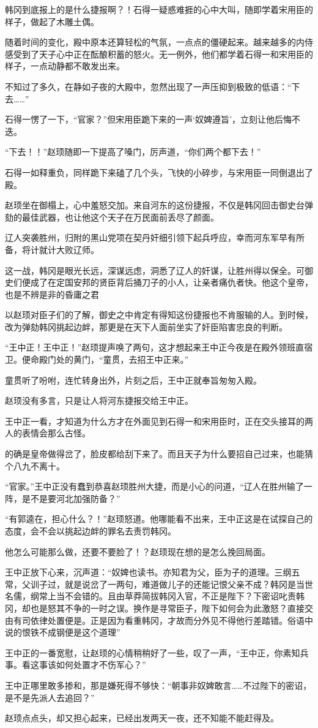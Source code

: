 韩冈到底报上的是什么捷报啊？！石得一疑惑难捱的心中大叫，随即学着宋用臣的样子，做起了木雕土偶。

随着时间的变化，殿中原本还算轻松的气氛，一点点的僵硬起来。越来越多的内侍感受到了天子心中正在酝酿积蓄的怒火。无一例外，他们都学着石得一和宋用臣的样子，一点动静都不敢发出来。

不知过了多久，在静如子夜的大殿中，忽然出现了一声压抑到极致的低语：“下去……”

石得一愣了一下，“官家？”但宋用臣跪下来的一声‘奴婢遵旨’，立刻让他后悔不迭。

“下去！！”赵顼随即一下提高了嗓门，厉声道，“你们两个都下去！”

石得一如释重负，同样跪下来磕了几个头，飞快的小碎步，与宋用臣一同倒退出了殿。

赵顼坐在御榻上，心中羞怒交加。来自河东的这份捷报，不仅是韩冈回击御史台弹劾的最佳武器，也让他这个天子在万民面前丢尽了颜面。

辽人突袭胜州，归附的黑山党项在契丹奸细引领下起兵呼应，幸而河东军早有所备，将计就计大败辽师。

这一战，韩冈是眼光长远，深谋远虑，洞悉了辽人的奸谋，让胜州得以保全。可御史们便成了在定国安邦的贤臣背后捅刀子的小人，让亲者痛仇者快。他这个皇帝，也是不辨是非的昏庸之君

以赵顼对臣子们的了解，御史之中肯定有得知这份捷报也不肯服输的人。到时候，改为弹劾韩冈挑起边衅，那更是在天下人面前坐实了奸臣陷害忠良的判断。

“王中正！王中正！”赵顼提声唤了两句，这才想起来王中正今夜是在殿外领班直宿卫。便命殿门处的黄门，“童贯，去招王中正来。”

童贯听了吩咐，连忙转身出外，片刻之后，王中正就奉旨匆匆入殿。

赵顼没有多言，只是让人将河东捷报交给王中正。

王中正一看，才知道为什么方才在外面见到石得一和宋用臣时，正在交头接耳的两人的表情会那么古怪。

的确是皇帝做得岔了，脸皮都给刮下来了。而且天子为什么要招自己过来，也能猜个八九不离十。

“官家。”王中正没有蠢到恭喜赵顼胜州大捷，而是小心的问道，“辽人在胜州输了一阵，是不是要河北加强防备？”

“有郭逵在，担心什么？！”赵顼怒道。他哪能看不出来，王中正这是在试探自己的态度，会不会以挑起边衅的罪名去责罚韩冈。

他怎么可能那么做，还要不要脸了！？赵顼现在想的是怎么挽回局面。

王中正放下心来，沉声道：“奴婢也读书。亦知君为父，臣为子的道理。三纲五常，父训子过，就是说岔了一两句，难道做儿子的还能记恨父亲不成？韩冈是当世名儒，纲常上当不会错的。且由草莽简拔韩冈入官，不正是陛下？下密诏叱责韩冈，却也是怒其不争的一时之误。换作是寻常臣子，陛下如何会为此激怒？直接交由有司依律处置便是。正是因为看重韩冈，才故而分外见不得他行差踏错。俗语中说的恨铁不成钢便是这个道理”

王中正的一番宽慰，让赵顼的心情稍稍好了一些，叹了一声，“王中正，你素知兵事。看这事该如何处置才不伤军心？”

王中正哪里敢多掺和，那是嫌死得不够快：“朝事非奴婢敢言……不过陛下的密诏，是不是先派人去追回？”

赵顼点点头，却又担心起来，已经出发两天一夜，还不知能不能赶得及。

